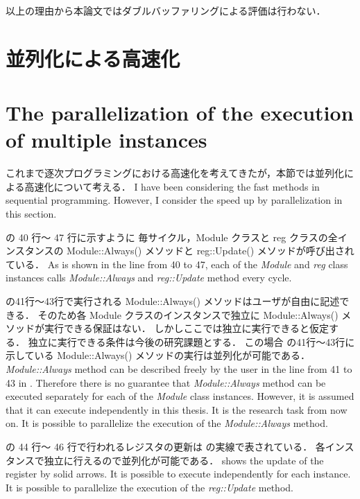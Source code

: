 以上の理由から本論文ではダブルバッファリングによる評価は行わない．

\fi

\section{並列化による高速化} \label{ss:parallel}
\fi
\section{The parallelization of the execution of multiple instances} \label{ss:parallel}

これまで逐次プログラミングにおける高速化を考えてきたが，本節では並列化による高速化について考える．
\fi
I have been considering the fast methods in sequential programming.
However, I consider the speed up by parallelization in this section.

 の 40 行〜 47 行に示すように
毎サイクル，Module クラスと reg クラスの全インスタンスの Module::Always() メソッドと reg::Update() メソッドが呼び出されている．
\fi
As  is shown in the line from 40 to 47,
each of the \textit{Module} and \textit{reg} class instances
calls \textit{Module::Always} and \textit{reg::Update} method every cycle.

 の41行〜43行で実行される Module::Always() メソッドはユーザが自由に記述できる．
そのため各 Module クラスのインスタンスで独立に Module::Always() メソッドが実行できる保証はない．
しかしここでは独立に実行できると仮定する．
独立に実行できる条件は今後の研究課題とする．
この場合 の41行〜43行に示している Module::Always() メソッドの実行は並列化が可能である．
\fi
\textit{Module::Always} method can be described freely by the user in the line from 41 to 43 in .
Therefore there is no guarantee that \textit{Module::Always} method can be executed separately for each of the \textit{Module} class instances.
However, it is assumed that it can execute independently in this thesis.
It is the research task from now on.
It is possible to parallelize the execution of the \textit{Module::Always} method.

 の 44 行〜 46 行で行われるレジスタの更新は の実線で表されている．
各インスタンスで独立に行えるので並列化が可能である．
\fi
{} shows the update of the register by solid arrows.
It is possible to execute independently for each instance.
It is possible to parallelize the execution of the \textit{reg::Update} method.

